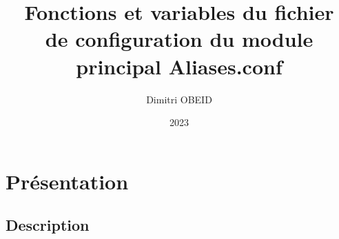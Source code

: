 \documentclass[a4paper,10pt]{article}
\title{\color{sec1}Fonctions et variables du fichier \\de configuration du module \\principal \color{path}Aliases.conf}\color{text}
\author{Dimitri OBEID}
\date{2023}
\begin{document}
    \maketitle
    \newpage

    \hypertarget{contents}{}
    \tableofcontents
    \newpage

    \color{sec1}
    \section{Présentation}\color{text}

    \color{sec2}
    \subsection{Description}\color{text}
\end{document}
